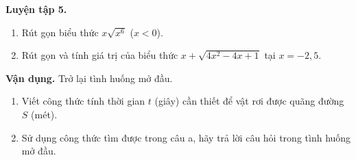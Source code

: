 \begin{lesson}
    \textbf{Luyện tập 5.}
    \begin{enumerate}[label=\alph*)]
        \item Rút gọn biểu thức $x\sqrt{x^6}$ ($x<0$).

        \answerline
        \item Rút gọn và tính giá trị của biểu thức $x+\sqrt{4x^2-4x+1}$ tại $x=-2{,}5$.

        \answerline
        \answerline
    \end{enumerate}

    \textbf{Vận dụng.} Trở lại tình huống mở đầu.
    \begin{enumerate}[label=\alph*)]
        \item Viết công thức tính thời gian $t$ (giây) cần thiết để vật rơi được quãng đường $S$ (mét).
        \item Sử dụng công thức tìm được trong câu a, hãy trả lời câu hỏi trong tình huống mở đầu.
    \end{enumerate}

    \answerline
    \answerline
\end{lesson}

